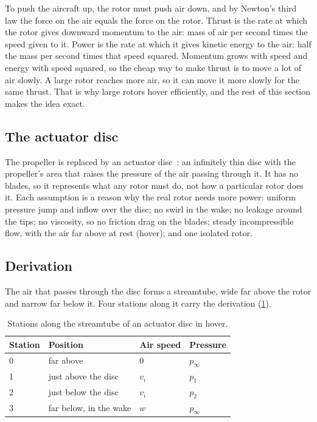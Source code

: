 To push the aircraft up, the rotor must push air down, and by Newton's third law the force on the air equals the force on the rotor. Thrust is the rate at which the rotor gives downward momentum to the air: mass of air per second times the speed given to it. Power is the rate at which it gives kinetic energy to the air: half the mass per second times that speed squared. Momentum grows with speed and energy with speed squared, so the cheap way to make thrust is to move a lot of air slowly. A large rotor reaches more air, so it can move it more slowly for the same thrust. That is why large rotors hover efficiently, and the rest of this section makes the idea exact.

\subsection{The actuator disc}

The propeller is replaced by an actuator disc~\citep{leishman}: an infinitely thin disc with the propeller's area that raises the pressure of the air passing through it. It has no blades, so it represents what any rotor must do, not how a particular rotor does it. Each assumption is a reason why the real rotor needs more power: uniform pressure jump and inflow over the disc; no swirl in the wake; no leakage around the tips; no viscosity, so no friction drag on the blades; steady incompressible flow, with the air far above at rest (hover); and one isolated rotor.

\subsection{Derivation}

The air that passes through the disc forms a streamtube, wide far above the rotor and narrow far below it. Four stations along it carry the derivation (\cref{tab:sizing-stations}).

\begin{table}[htbp]
\centering\small
\caption{Stations along the streamtube of an actuator disc in hover.}\label{tab:sizing-stations}
\begin{tabular}{@{}llll@{}}
\toprule
Station & Position & Air speed & Pressure\\
\midrule
0 & far above & 0 & $p_\infty$\\
1 & just above the disc & $v_i$ & $p_1$\\
2 & just below the disc & $v_i$ & $p_2$\\
3 & far below, in the wake & $w$ & $p_\infty$\\
\bottomrule
\end{tabular}
\end{table}

